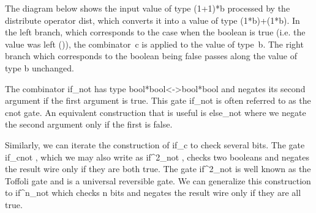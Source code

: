 \documentclass[preprint]{sigplanconf}
\begin{document}
\noindent The diagram below shows the input value of type {{(1+1)*b}}
processed by the distribute operator {{dist}}, which converts it into a value
of type {{(1*b)+(1*b)}}. In the {{left}} branch, which corresponds to the
case when the boolean is {{true}} (i.e. the value was {{left ()}}), the
combinator~{{c}} is applied to the value of type~{{b}}. The right branch
which corresponds to the boolean being {{false}} passes along the value of
type {{b}} unchanged.

\begin{center}
\end{center}


The combinator {{if_{not} }} has type {{bool*bool<->bool*bool}} and
negates its second argument if the first argument is {{true}}. This
gate {{if_{not} }} is often referred to as the {{cnot}} gate. An
equivalent construction that is useful is {{else_{not} }} where we
negate the second argument only if the first is {{false}}. 

Similarly, we can iterate the construction of {{if_c}} to check several
bits. The gate {{if_{cnot} }}, which we may also write as {{if^2_{not} }},
checks two booleans and negates the result wire only if they are both
{{true}}. The gate {{if^2_{not} }} is well known as the Toffoli gate and is a
universal reversible gate. We can generalize this construction to
{{if^n_{not} }} which checks {{n}} bits and negates the result wire only if
they are all {{true}}.
\end{document}
